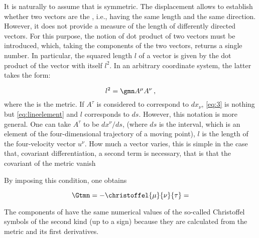 It is naturally to assume that is symmetric. The displacement allows to establish whether two vectors are the , i.e., having the same length and the same direction. However, it does not provide a measure of the length of differently directed vectors. For this purpose, the notion of dot product of two vectors must be introduced, which, taking the components of the two vectors, returns a single number. In particular, the squared length $l$ of a vector is given by the dot product of the vector with itself $l^2$. In an arbitrary coordinate system, the latter takes the form:

\begin{equation}\label{eq:3}
l^2=\gmn A^\mu A^\nu\,,
\end{equation}
%
where the \gmn is the metric. If $A^\tau$ is considered to correspond to $dx_\nu$, \cref{eq:3} is nothing but \cref{eq:lineelement} and $l$ corresponds to $ds$. However, this notation is more general. One can take $A^\tau$ to be $dx^\nu/ds$, (where $ds$ is the \til interval, which is an element of the four-dimensional trajectory of a moving point), $l$ is the length of the four-velocity vector $u^\nu$. How much a vector varies, this is simple in the case that, covariant differentiation, a second term is necessary, that is that the covariant of the metric vanish


By imposing this condition, one obtains 

\begin{equation}\label{eq:riemannconnection}
\Gtmn=-\christoffel{\mu}{\nu}{\tau} =
\end{equation}
%

The components of \Gtmn have the same numerical values of the so-called Christoffel symbols of the second kind (up to a sign) because they are calculated from the metric \gmn and its first derivatives.





